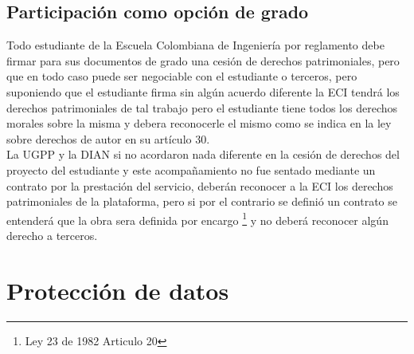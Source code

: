 \documentclass[
letterpaper,
12pt,
singlespacing,
headsepline]{article}
\begin{document}
\subsection{Participación como opción de grado}
Todo estudiante de la Escuela Colombiana de Ingeniería por reglamento debe firmar para sus documentos de grado una cesión de derechos patrimoniales, pero que en todo caso puede ser negociable con el estudiante o terceros, pero suponiendo que el estudiante firma sin algún acuerdo diferente la ECI tendrá los derechos patrimoniales de tal trabajo pero el  estudiante tiene todos los derechos morales sobre la misma y debera reconocerle el mismo como se indica en la ley sobre derechos de autor en su artículo 30.
\\
La UGPP y la DIAN si no acordaron nada diferente en la cesión de derechos del proyecto del estudiante y este acompañamiento no fue sentado mediante un contrato por la prestación del servicio, deberán reconocer a la ECI los derechos patrimoniales de la plataforma, pero si por el contrario se definió un contrato se entenderá que la obra sera definida por encargo \footnote{Ley 23 de 1982 Articulo 20} y no deberá reconocer algún derecho a terceros.


\section{Protección de datos}
\end{document}
